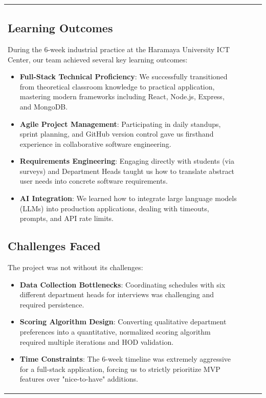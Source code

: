 \documentclass[12pt, a4paper]{article}
\begin{document}
\begin{itemize}[leftmargin=1.5em, itemsep=3pt]
\begin{table}[H]
\begin{tabularx}{\textwidth}{>{\raggedright\arraybackslash}p{0.8cm}>{\raggedright\arraybackslash}p{3.5cm}>{\raggedright\arraybackslash}X>{\raggedright\arraybackslash}p{2.5cm}}
\subsection{Learning Outcomes}
During the 6-week industrial practice at the Haramaya University ICT Center, our team achieved several key learning outcomes:
\begin{itemize}
    \item \textbf{Full-Stack Technical Proficiency}: We successfully transitioned from theoretical classroom knowledge to practical application, mastering modern frameworks including React, Node.js, Express, and MongoDB.
    \item \textbf{Agile Project Management}: Participating in daily standups, sprint planning, and GitHub version control gave us firsthand experience in collaborative software engineering.
    \item \textbf{Requirements Engineering}: Engaging directly with students (via surveys) and Department Heads taught us how to translate abstract user needs into concrete software requirements.
    \item \textbf{AI Integration}: We learned how to integrate large language models (LLMs) into production applications, dealing with timeouts, prompts, and API rate limits.
\end{itemize}

\subsection{Challenges Faced}
The project was not without its challenges:
\begin{itemize}
    \item \textbf{Data Collection Bottlenecks}: Coordinating schedules with six different department heads for interviews was challenging and required persistence.
    \item \textbf{Scoring Algorithm Design}: Converting qualitative department preferences into a quantitative, normalized scoring algorithm required multiple iterations and HOD validation.
    \item \textbf{Time Constraints}: The 6-week timeline was extremely aggressive for a full-stack application, forcing us to strictly prioritize MVP features over "nice-to-have" additions.
\end{itemize}


\end{tabularx}
\end{table}
\end{itemize}
\end{document}

